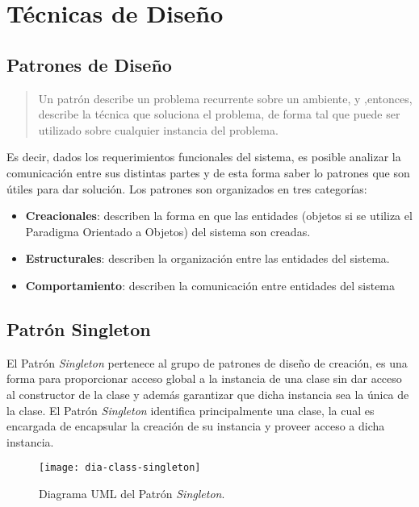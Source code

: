 \chapter{Técnicas de Diseño}\label{sec:patrones}
\section{Patrones de Diseño}
\begin{quote}
Un patrón describe un problema recurrente sobre un ambiente, y ,entonces, describe la técnica que soluciona el problema, de forma tal que puede ser utilizado sobre cualquier instancia del problema\cite{DesignPatterns}.
\end{quote}
Es decir, dados los requerimientos funcionales del sistema, es posible analizar la comunicación entre sus distintas partes y de esta forma saber lo patrones que son útiles para dar solución. Los patrones son organizados en tres categorías\cite{DesignPatterns}:
\begin{itemize}
	\item \textbf{Creacionales}: describen la forma en que las entidades (objetos si se utiliza el Paradigma Orientado a Objetos) del sistema son creadas.
	\item \textbf{Estructurales}: describen la organización entre las entidades del sistema.
	\item \textbf{Comportamiento}: describen la comunicación entre entidades del sistema
\end{itemize}
\section{Patrón Singleton}\label{sec:singleton}
El Patrón \textit{Singleton} pertenece al grupo de patrones de diseño de creación, es una forma para proporcionar acceso global a la instancia de una clase sin dar acceso al constructor de la clase y además garantizar que dicha instancia sea la única de la clase. El Patrón \textit{Singleton} identifica principalmente una clase, la cual es encargada de encapsular la creación de su instancia y proveer acceso a dicha instancia\cite{DesignPatternsLasater, DesignPatterns, OCPJavaSE7}.
\begin{figure}[h]
  \centering
  \texttt{[image: dia-class-singleton]}
  \caption{Diagrama UML del Patrón \textit{Singleton}\cite{DesignPatternsLasater}.}
  \label{fig:dia-class-singleton}
\end{figure}
